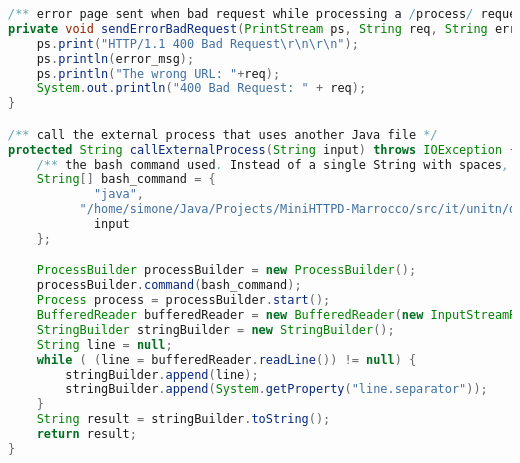 \begin{lstlisting}[language=java, caption={functions added to the class TinyHttpdConnection}]
/** error page sent when bad request while processing a /process/ request */
private void sendErrorBadRequest(PrintStream ps, String req, String error_msg) {
    ps.print("HTTP/1.1 400 Bad Request\r\n\r\n");
    ps.println(error_msg);
    ps.println("The wrong URL: "+req);
    System.out.println("400 Bad Request: " + req);
}

/** call the external process that uses another Java file */
protected String callExternalProcess(String input) throws IOException {
    /** the bash command used. Instead of a single String with spaces, we need an array of Strings */
    String[] bash_command = {
            "java",
          "/home/simone/Java/Projects/MiniHTTPD-Marrocco/src/it/unitn/disi/webarch/tinyhttpd/ReverseString.java",
            input
    };

    ProcessBuilder processBuilder = new ProcessBuilder();
    processBuilder.command(bash_command);
    Process process = processBuilder.start();
    BufferedReader bufferedReader = new BufferedReader(new InputStreamReader(process.getInputStream()));
    StringBuilder stringBuilder = new StringBuilder();
    String line = null;
    while ( (line = bufferedReader.readLine()) != null) {
        stringBuilder.append(line);
        stringBuilder.append(System.getProperty("line.separator"));
    }
    String result = stringBuilder.toString();
    return result;
}
\end{lstlisting}
